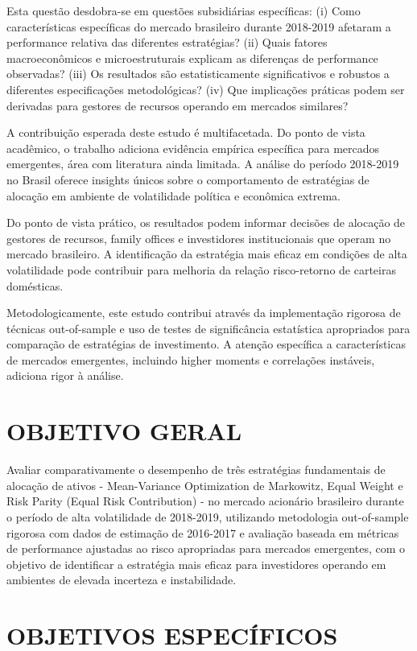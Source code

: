 Esta questão desdobra-se em questões subsidiárias específicas: (i) Como características específicas do mercado brasileiro durante 2018-2019 afetaram a performance relativa das diferentes estratégias? (ii) Quais fatores macroeconômicos e microestruturais explicam as diferenças de performance observadas? (iii) Os resultados são estatisticamente significativos e robustos a diferentes especificações metodológicas? (iv) Que implicações práticas podem ser derivadas para gestores de recursos operando em mercados similares?

A contribuição esperada deste estudo é multifacetada. Do ponto de vista acadêmico, o trabalho adiciona evidência empírica específica para mercados emergentes, área com literatura ainda limitada. A análise do período 2018-2019 no Brasil oferece insights únicos sobre o comportamento de estratégias de alocação em ambiente de volatilidade política e econômica extrema.

Do ponto de vista prático, os resultados podem informar decisões de alocação de gestores de recursos, family offices e investidores institucionais que operam no mercado brasileiro. A identificação da estratégia mais eficaz em condições de alta volatilidade pode contribuir para melhoria da relação risco-retorno de carteiras domésticas.

Metodologicamente, este estudo contribui através da implementação rigorosa de técnicas out-of-sample e uso de testes de significância estatística apropriados para comparação de estratégias de investimento. A atenção específica a características de mercados emergentes, incluindo higher moments e correlações instáveis, adiciona rigor à análise.

\section{OBJETIVO GERAL}

Avaliar comparativamente o desempenho de três estratégias fundamentais de alocação de ativos - Mean-Variance Optimization de Markowitz, Equal Weight e Risk Parity (Equal Risk Contribution) - no mercado acionário brasileiro durante o período de alta volatilidade de 2018-2019, utilizando metodologia out-of-sample rigorosa com dados de estimação de 2016-2017 e avaliação baseada em métricas de performance ajustadas ao risco apropriadas para mercados emergentes, com o objetivo de identificar a estratégia mais eficaz para investidores operando em ambientes de elevada incerteza e instabilidade.

\section{OBJETIVOS ESPECÍFICOS}

